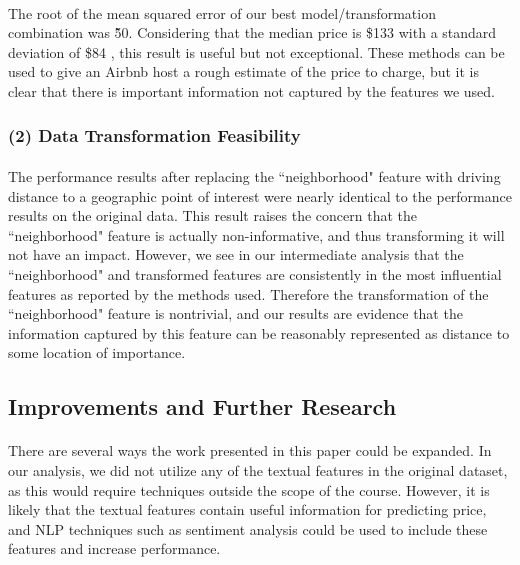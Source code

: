 \documentclass[11pt]{article}
\begin{document}
        	\paragraph{}
            	The root of the mean squared error of our best model/transformation combination was \~50. Considering that the median price is \$133 with a standard deviation of \$84 , this result is useful but not exceptional. These methods can be used to give an Airbnb host a rough estimate of the price to charge, but it is clear that there is important information not captured by the features we used.
            
         \subsubsection*{(2) Data Transformation Feasibility}
         	\paragraph{}
            	The performance results after replacing the ``neighborhood" feature with driving distance to a geographic point of interest were nearly identical to the performance results on the original data. This result raises the concern that the ``neighborhood" feature is actually non-informative, and thus transforming it will not have an impact. However, we see in our intermediate analysis that the ``neighborhood" and transformed features are consistently in the most influential features as reported by the methods used. Therefore the transformation of the ``neighborhood" feature is nontrivial, and our results are evidence that the information captured by this feature can be reasonably represented as distance to some location of importance. 
    
    \subsection{Improvements and Further Research}
    	\paragraph{}
        	There are several ways the work presented in this paper could be expanded. In our analysis, we did not utilize any of the textual features in the original dataset, as this would require techniques outside the scope of the course. However, it is likely that the textual features contain useful information for predicting price, and NLP techniques such as sentiment analysis could be used to include these features and increase performance.
\end{document}

